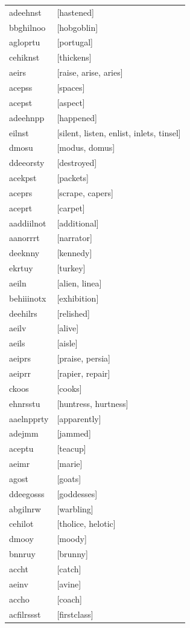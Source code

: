 \documentclass{article}
\begin{document}
\begin{tabular}{ll}
adeehnst & [hastened] \\
bbghilnoo & [hobgoblin] \\
agloprtu & [portugal] \\
cehiknst & [thickens] \\
aeirs & [raise, arise, aries] \\
acepss & [spaces] \\
acepst & [aspect] \\
adeehnpp & [happened] \\
eilnst & [silent, listen, enlist, inlets, tinsel] \\
dmosu & [modus, domus] \\
ddeeorsty & [destroyed] \\
acekpst & [packets] \\
aceprs & [scrape, capers] \\
aceprt & [carpet] \\
aaddiilnot & [additional] \\
aanorrrt & [narrator] \\
deeknny & [kennedy] \\
ekrtuy & [turkey] \\
aeiln & [alien, linea] \\
behiiinotx & [exhibition] \\
deehilrs & [relished] \\
aeilv & [alive] \\
aeils & [aisle] \\
aeiprs & [praise, persia] \\
aeiprr & [rapier, repair] \\
ckoos & [cooks] \\
ehnrsstu & [huntress, hurtness] \\
aaelnpprty & [apparently] \\
adejmm & [jammed] \\
aceptu & [teacup] \\
aeimr & [marie] \\
agost & [goats] \\
ddeegosss & [goddesses] \\
abgilnrw & [warbling] \\
cehilot & [tholice, helotic] \\
dmooy & [moody] \\
bnnruy & [brunny] \\
accht & [catch] \\
aeinv & [avine] \\
accho & [coach] \\
acfilrssst & [firstclass] \\

\end{tabular}
\end{document}
